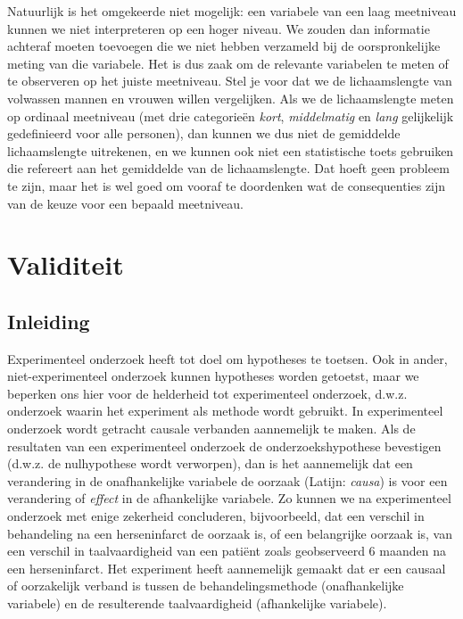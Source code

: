 \documentclass[
]{book}
\begin{document}
Natuurlijk is het omgekeerde niet mogelijk: een variabele van een laag
meetniveau kunnen we niet interpreteren op een hoger niveau. We zouden
dan informatie achteraf moeten toevoegen die we niet hebben verzameld
bij de oorspronkelijke meting van die variabele. Het is dus zaak om de
relevante variabelen te meten of te observeren op het juiste meetniveau.
Stel je
voor dat we de lichaamslengte van volwassen mannen en vrouwen willen
vergelijken. Als we de lichaamslengte meten op ordinaal meetniveau (met
drie categorieën \emph{kort}, \emph{middelmatig} en \emph{lang} gelijkelijk
gedefinieerd voor alle personen), dan kunnen we dus niet de gemiddelde
lichaamslengte uitrekenen, en we kunnen ook niet een statistische toets
gebruiken die refereert aan het gemiddelde van de lichaamslengte. Dat
hoeft geen probleem te zijn, maar het is wel goed om vooraf te
doordenken wat de consequenties zijn van de keuze voor een bepaald
meetniveau.

\hypertarget{ch:validiteit}{%
\chapter{Validiteit}\label{ch:validiteit}}

\hypertarget{inleiding-2}{%
\section{Inleiding}\label{inleiding-2}}

Experimenteel onderzoek heeft tot doel om hypotheses te toetsen. Ook in
ander, niet-experimenteel onderzoek kunnen hypotheses worden getoetst,
maar we beperken ons hier voor de helderheid tot experimenteel
onderzoek, d.w.z. onderzoek waarin het experiment als methode wordt
gebruikt. In experimenteel onderzoek wordt getracht causale verbanden
aannemelijk te maken. Als de resultaten van een experimenteel onderzoek
de onderzoekshypothese bevestigen (d.w.z. de nulhypothese wordt
verworpen), dan is het aannemelijk dat een verandering in de
onafhankelijke variabele de oorzaak (Latijn: \emph{causa}) is voor een
verandering of \emph{effect} in de afhankelijke variabele. Zo kunnen we na
experimenteel onderzoek met enige zekerheid concluderen, bijvoorbeeld,
dat een verschil in behandeling na een herseninfarct de oorzaak is, of
een belangrijke oorzaak is, van een verschil in taalvaardigheid van een
patiënt zoals geobserveerd 6 maanden na een herseninfarct. Het
experiment heeft aannemelijk gemaakt dat er een causaal of oorzakelijk
verband is tussen de behandelingsmethode (onafhankelijke variabele) en
de resulterende taalvaardigheid (afhankelijke variabele).
\end{document}
